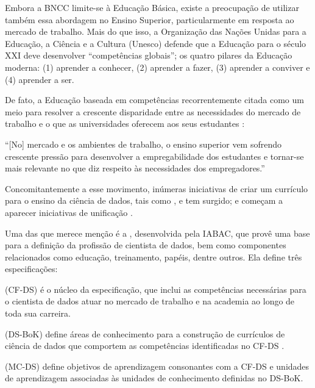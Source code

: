 Embora a BNCC limite-se à Educação Básica, existe a preocupação de utilizar também essa abordagem no Ensino Superior, particularmente em resposta ao mercado de trabalho.
Mais do que isso, a Organização das Nações Unidas para a Educação, a Ciência e a Cultura (Unesco) defende que a Educação para o século XXI deve desenvolver ``competências globais''; os quatro pilares da Educação moderna: (1) aprender a conhecer, (2) aprender a fazer, (3) aprender a conviver e (4) aprender a ser.

De fato, a Educação baseada em competências recorrentemente citada como um meio para resolver a crescente disparidade entre as necessidades do mercado de trabalho e o que as universidades oferecem aos seus estudantes \cite{Zulauf2006}: 

\begin{mycitation}
	``[No] mercado e os ambientes de trabalho, o ensino superior vem sofrendo crescente pressão para desenvolver a empregabilidade dos estudantes e tornar-se mais relevante no que diz respeito às necessidades dos empregadores.''
\end{mycitation}

Concomitantemente a esse movimento, inúmeras iniciativas  de criar um currículo para o ensino da ciência de dados, tais como \cite{Hassan2019}, \cite{Anderson2014} e \cite{Cheng2019} tem surgido; e começam a aparecer iniciativas de unificação \cite{Raj2019}.

Uma das que merece menção é a , desenvolvida pela IABAC, que provê uma base para a definição da profissão de cientista de dados, bem como componentes relacionados como educação, treinamento, papéis, dentre outros.
Ela define três especificações:
\begin{compactitem}
	\item {} (CF-DS) é o núcleo da especificação, que inclui as competências necessárias para o cientista de dados atuar no mercado de trabalho e na academia ao longo de toda sua carreira.
	\item {} (DS-BoK) define áreas de conhecimento para a construção de currículos de ciência de dados que comportem as competências identificadas no CF-DS \cite{Demchenko2017}.
	\item {} (MC-DS) define objetivos de aprendizagem consonantes com a CF-DS e unidades de aprendizagem associadas às unidades de conhecimento definidas no DS-BoK.
\end{compactitem}

